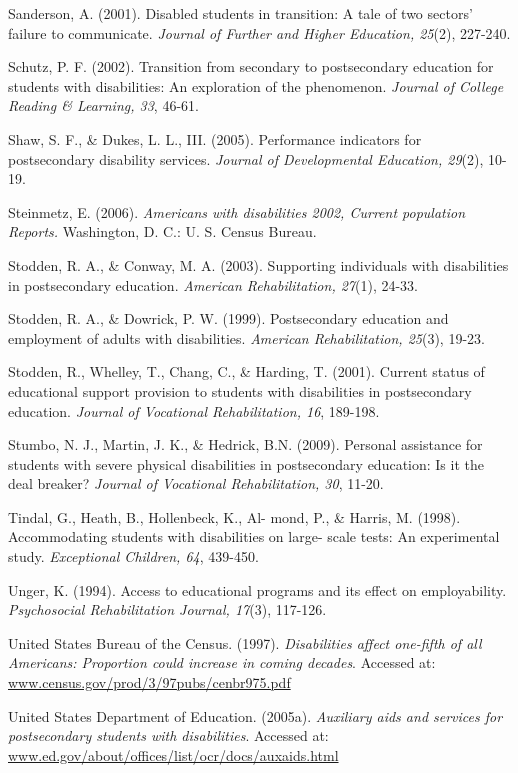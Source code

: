 \documentclass[11.5pt]{sig-alternate} %
\begin{document}
Sanderson, A. (2001). Disabled students in transition: A tale of two sectors' failure to communicate. \textit{Journal of Further and Higher Education, 25}(2), 227-240.

Schutz, P. F. (2002). Transition from secondary to postsecondary education for students with disabilities: An exploration of the phenomenon. \textit{Journal of College Reading \& Learning, 33}, 46-61.

Shaw, S. F., \& Dukes, L. L., III. (2005). Performance indicators for postsecondary disability services. \textit{Journal of Developmental Education, 29}(2), 10-19.

Steinmetz, E. (2006). \textit{Americans with disabilities 2002, Current population Reports.} Washington, D. C.: U. S. Census Bureau.

Stodden, R. A., \& Conway, M. A. (2003). Supporting individuals with disabilities in postsecondary education. \textit{American Rehabilitation, 27}(1), 24-33.

Stodden, R. A., \& Dowrick, P. W. (1999). Postsecondary education and employment of adults with disabilities. \textit{American Rehabilitation, 25}(3), 19-23.

Stodden, R., Whelley, T., Chang, C., \& Harding, T. (2001). Current status of educational support provision to students with disabilities in postsecondary education. \textit{Journal of Vocational Rehabilitation, 16}, 189-198.

Stumbo, N. J., Martin, J. K., \& Hedrick, B.N. (2009). Personal assistance for students with severe physical disabilities in postsecondary education: Is it the deal breaker? \textit{Journal of Vocational Rehabilitation, 30}, 11-20.

Tindal, G., Heath, B., Hollenbeck, K., Al- mond, P., \& Harris, M. (1998). Accommodating students with disabilities on large- scale tests: An experimental study. \textit{Exceptional Children, 64}, 439-450.

Unger, K. (1994). Access to educational programs and its effect on employability. \textit{Psychosocial Rehabilitation Journal, 17}(3), 117-126.

United States Bureau of the Census. (1997). \textit{Disabilities affect one-fifth of all Americans: Proportion could increase in coming decades}. Accessed at: \url{www.census.gov/prod/3/97pubs/cenbr975.pdf}

United States Department of Education. (2005a). \textit{Auxiliary aids and services for postsecondary students with disabilities}. Accessed at: \url{www.ed.gov/about/offices/list/ocr/docs/auxaids.html}
\end{document}
